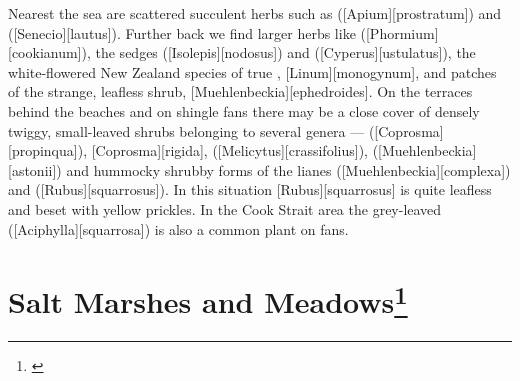 Nearest the sea are scattered succulent herbs such as  ([Apium][prostratum]) and  ([Senecio][lautus]).
Further back we find larger herbs like  ([Phormium][cookianum]), the sedges  ([Isolepis][nodosus]) and  ([Cyperus][ustulatus]), the white-flowered New Zealand species of true , [Linum][monogynum], and patches of the strange, leafless shrub, [Muehlenbeckia][ephedroides].
On the terraces behind the beaches and on shingle fans there may be a close cover of densely twiggy, small-leaved shrubs belonging to several genera ---  ([Coprosma][propinqua]), [Coprosma][rigida],  ([Melicytus][crassifolius]),  ([Muehlenbeckia][astonii]) and hummocky shrubby forms of the lianes  ([Muehlenbeckia][complexa]) and  ([Rubus][squarrosus]).
In this situation [Rubus][squarrosus] is quite leafless and beset with yellow prickles.
In the Cook Strait area the grey-leaved  ([Aciphylla][squarrosa]) is also a common plant on fans.

\section[Salt Marshes and Meadows]{Salt Marshes and Meadows\thinspace\footnote{\cite{moore1963plants}}}

